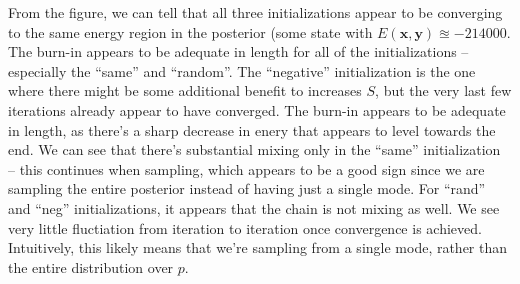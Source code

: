 \documentclass[12pt]{article}
\newcommand{\vect}[1]{\boldsymbol{#1}}
\begin{document}
\begin{enumerate}[label=(\alph*)]
From the figure, we can tell that all three initializations appear to be converging to the same energy region in the posterior (some state with $E(\vect{x}, \vect{y}) \approxeq -214000$. The burn-in appears to be adequate in length for all of the initializations -- especially the ``same'' and ``random''. The ``negative'' initialization is the one where there might be some additional benefit to increases $S$, but the very last few iterations already appear to have converged. The burn-in appears to be adequate in length, as there's a sharp decrease in enery that appears to level towards the end. We can see that there's substantial mixing only in the ``same'' initialization -- this continues when sampling, which appears to be a good sign since we are sampling the entire posterior instead of having just a single mode. For ``rand'' and ``neg'' initializations, it appears that the chain is not mixing as well. We see very little fluctiation from iteration to iteration once convergence is achieved. Intuitively, this likely means that we're sampling from a single mode, rather than the entire distribution over $p$.
\end{enumerate}
\end{document}
